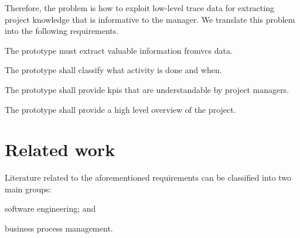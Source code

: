 Therefore, the problem is how to exploit low-level trace data for extracting project knowledge that is informative to the manager. We translate this problem into the following requirements.

\noindent
\begin{inparadesc}
\item[RQ1. (Processing of \gls{vcs} event logs).] The prototype must extract valuable information from\gls{vcs} data. \\
\item[RQ2. (Identification of the activities).] The prototype shall classify what activity is done and when.\\
\item[RQ3. (Computation of KPIs).] The prototype shall provide \glspl{kpi} that are understandable by project managers.\\
\item[RQ4. (Visualization of project status).] The prototype shall provide a high level overview of the project.
\end{inparadesc}



\section{Related work}
\label{subsec:requirements}

Literature related to the aforementioned requirements can be classified into two main groups: \begin{inparaenum}[\itshape (i)]
\item software engineering; and 
\item business process management.
\end{inparaenum} 

% 

